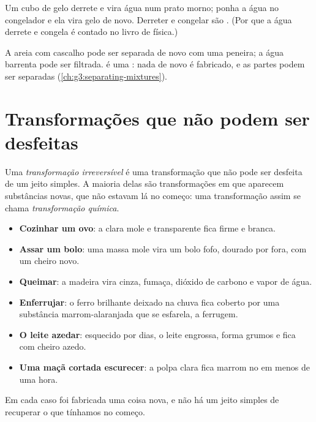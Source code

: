 \begin{example}\label{ex:g5:irreversible-changes:ice}
Um cubo de gelo derrete e vira água num prato morno; ponha a água no
congelador e ela vira gelo de novo. Derreter e congelar são
. (Por que a água derrete e congela é contado
no livro de física.)
\end{example}

\begin{example}[Misturar]\label{ex:g5:irreversible-changes:mix}
A areia  com cascalho pode ser separada de novo com uma
peneira; a água barrenta pode ser filtrada.  é uma : nada de novo é fabricado, e as partes podem ser separadas
(\cref{ch:g3:separating-mixtures}).
\end{example}

\section{Transformações que não podem ser desfeitas}

\begin{definition}\label{def:g5:irreversible-changes:chemical-change}
Uma \emph{transformação irreversível} é
uma transformação que não pode ser desfeita de um jeito simples. A
maioria delas são transformações em que aparecem substâncias novas, que
não estavam lá no começo: uma transformação assim se chama
\emph{transformação química}.
\end{definition}

\begin{example}\label{ex:g5:irreversible-changes:six}
\begin{itemize}
  \item \textbf{Cozinhar um ovo}: a clara mole e transparente fica firme
        e branca.
  \item \textbf{Assar um bolo}: uma massa mole vira um bolo fofo, dourado
        por fora, com um cheiro novo.
  \item \textbf{Queimar}: a madeira vira cinza, fumaça, dióxido de
        carbono e vapor de água.
  \item \textbf{Enferrujar}: o ferro brilhante deixado na chuva fica
        coberto por uma substância marrom-alaranjada que se esfarela, a
        ferrugem.
  \item \textbf{O leite azedar}: esquecido por dias, o leite engrossa,
        forma grumos e fica com cheiro azedo.
  \item \textbf{Uma maçã cortada escurecer}: a polpa clara fica marrom no
         em menos de uma hora.
\end{itemize}
Em cada caso foi fabricada uma coisa nova, e não há um jeito simples de
recuperar o que tínhamos no começo.
\end{example}

